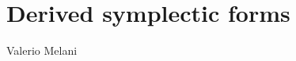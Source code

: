 \chapter{Derived symplectic forms}
\begin{flushright}
  Valerio Melani
\end{flushright}

\begin{refsection}
\printbibliography[heading = local]

\end{refsection}


